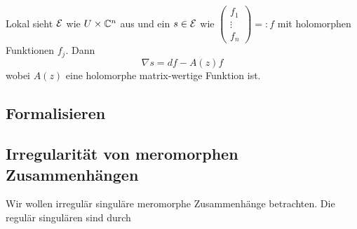 \begin{rem}
  Lokal sieht $\mathcal{E}$ wie $U\times\mathbb{C}^n$ aus und ein $s\in\mathcal{E}$ wie 
  $\begin{pmatrix}f_{1}\\ \vdots\\ f_{n} \end{pmatrix}=:f$ mit holomorphen
  Funktionen $f_j$.
  Dann
  \[
    \nabla s=df - A(z)f
  \]
  wobei $A(z)$ eine holomorphe matrix-wertige Funktion ist.
  \begin{comment}
    Wollen diese Klassifizieren. Klassifiziere diese durch die Lösung von
    $\nabla s=0$. Dies ist eine DGL (ODE).
  \end{comment}
\end{rem}
\subsection{Formalisieren} %
\TODO
\subsection{Irregularität von meromorphen Zusammenhängen} %
Wir wollen irregulär singuläre meromorphe Zusammenhänge betrachten. Die regulär
singulären sind durch \TODO
\TODO

\TODO[\cite{sabbah2007isomonodromic}: Def II.2.24]
